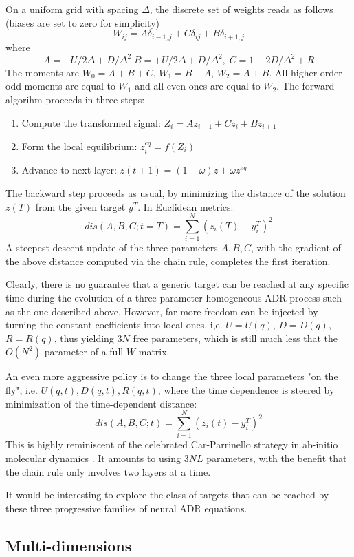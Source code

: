 \documentclass[15pt]{article}
\begin{document}
On a uniform grid with spacing $\Delta $, the discrete set of weights reads 
as follows (biases are set to zero for simplicity)
$$
W_{ij} = A \delta_{i-1,j} + C \delta_{ij} + B \delta_{i+1,j}
$$
where 
$$
A = -U/2\Delta + D/\Delta ^2\; 
B = +U/2\Delta + D/\Delta^2,\; 
C =  1 -2 D/\Delta^2 + R
$$
The moments are $W_0=A+B+C$, $W_1=B-A$, $W_2=A+B$.
All higher order odd moments are equal to $W_1$ and all even ones are equal to $W_2$.
The forward algorihm proceeds in three steps:
\begin{enumerate}
\item{} Compute the transformed signal: $Z_i=A z_{i-1} + C z_i + B z_{i+1}$
\item{} Form the local equilibrium:     $z_i^{eq}=f(Z_i)$
\item{} Advance to next layer:          $z(t+1) = (1-\omega) z + \omega z^{eq}$ 
\end{enumerate}

The backward step proceeds as usual, by minimizing 
the distance of the solution $z(T)$ from the given target $y^T$.
In Euclidean metrics: 
$$
dis(A,B,C;t=T)=\sum_{i=1}^N (z_i(T)-y_i^T)^2
$$
A steepest descent update of the three parameters $A,B,C$, with the gradient
of the above distance computed via the chain rule, completes the first iteration.  

Clearly, there is no guarantee that a generic target can be reached at any
specific time during the evolution of a three-parameter homogeneous ADR 
process such as the one described above.
However, far more freedom can be injected by turning the constant coefficients into
local ones, i,e. $U=U(q)$, $D=D(q)$, $R=R(q)$, thus yielding $3N$ free
parameters, which is still much less that the $O(N^2)$ parameter of a full $W$ matrix.  

An even more aggressive policy is to change the three local parameters "on the fly", i.e.
$U(q,t),D(q,t),R(q,t)$, where the time dependence is steered 
by minimization of the time-dependent distance: 
$$
dis(A,B,C;t)=\sum_{i=1}^N (z_i(t)-y_i^T)^2
$$
This is highly reminiscent of the celebrated Car-Parrinello 
strategy in ab-initio molecular dynamics \cite{CP}. 
It amounts to using $3NL$ parameters, with the benefit that
the chain rule only involves two layers at a time.

It would be interesting to explore the class of targets that can 
be reached by these three progressive families of neural ADR equations.

\subsection{Multi-dimensions}
\end{document}
